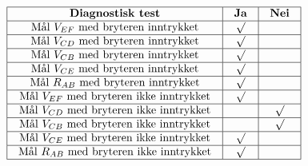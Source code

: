 
$$\vbox{\offinterlineskip
\halign{\strut
\vrule \quad\hfil # \ \hfil & 
\vrule \quad\hfil # \ \hfil & 
\vrule \quad\hfil # \ \hfil \vrule \cr
\noalign{\hrule}
%
{\bf Diagnostisk test} & {\bf Ja} & {\bf Nei} \cr
%
\noalign{\hrule}
%
Mål $V_{EF}$ med bryteren inntrykket & $\surd$ &  \cr
%
\noalign{\hrule}
%
Mål $V_{CD}$ med bryteren inntrykket & $\surd$ &  \cr
%
\noalign{\hrule}
%
Mål $V_{CB}$ med bryteren inntrykket & $\surd$ &  \cr
%
\noalign{\hrule}
%
Mål $V_{CE}$ med bryteren inntrykket & $\surd$ &  \cr
%
\noalign{\hrule}
%
Mål $R_{AB}$ med bryteren inntrykket & $\surd$ &  \cr
%
\noalign{\hrule}
%
Mål $V_{EF}$ med bryteren ikke inntrykket & $\surd$ &  \cr
%
\noalign{\hrule}
%
Mål $V_{CD}$ med bryteren ikke inntrykket &  & $\surd$ \cr
%
\noalign{\hrule}
%
Mål $V_{CB}$ med bryteren ikke inntrykket &  & $\surd$ \cr
%
\noalign{\hrule}
%
Mål $V_{CE}$ med bryteren ikke inntrykket & $\surd$ &  \cr
%
\noalign{\hrule}
%
Mål $R_{AB}$ med bryteren ikke inntrykket & $\surd$ &  \cr
%
\noalign{\hrule}
} %
}$$ %










